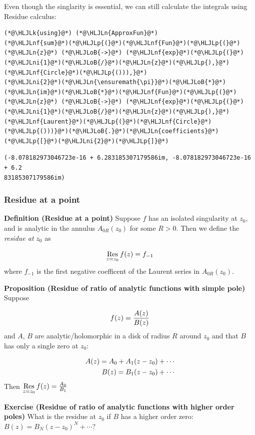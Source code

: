 \documentclass[12pt,a4paper]{article}
\newcommand{\HLJLk}[1]{\textcolor[RGB]{148,91,176}{\textbf{#1}}}
\newcommand{\HLJLn}[1]{#1}
\newcommand{\HLJLnf}[1]{\textcolor[RGB]{66,102,213}{#1}}
\newcommand{\HLJLni}[1]{\textcolor[RGB]{59,151,46}{#1}}
\newcommand{\HLJLoB}[1]{\textcolor[RGB]{102,102,102}{\textbf{#1}}}
\newcommand{\HLJLp}[1]{#1}
\begin{document}
Even though the singlarity is essential, we can still calculate the integrals using Residue calculus:


\begin{lstlisting}
(*@\HLJLk{using}@*) (*@\HLJLn{ApproxFun}@*)
(*@\HLJLnf{sum}@*)(*@\HLJLp{(}@*)(*@\HLJLnf{Fun}@*)(*@\HLJLp{(}@*)(*@\HLJLn{z}@*) (*@\HLJLoB{->}@*) (*@\HLJLnf{exp}@*)(*@\HLJLp{(}@*)(*@\HLJLni{1}@*)(*@\HLJLoB{/}@*)(*@\HLJLn{z}@*)(*@\HLJLp{),}@*) (*@\HLJLnf{Circle}@*)(*@\HLJLp{())),}@*) 
(*@\HLJLni{2}@*)(*@\HLJLn{\ensuremath{\pi}}@*)(*@\HLJLoB{*}@*)(*@\HLJLn{im}@*)(*@\HLJLoB{*}@*)(*@\HLJLnf{Fun}@*)(*@\HLJLp{(}@*)(*@\HLJLn{z}@*) (*@\HLJLoB{->}@*) (*@\HLJLnf{exp}@*)(*@\HLJLp{(}@*)(*@\HLJLni{1}@*)(*@\HLJLoB{/}@*)(*@\HLJLn{z}@*)(*@\HLJLp{),}@*) (*@\HLJLnf{Laurent}@*)(*@\HLJLp{(}@*)(*@\HLJLnf{Circle}@*)(*@\HLJLp{()))}@*)(*@\HLJLoB{.}@*)(*@\HLJLn{coefficients}@*)(*@\HLJLp{[}@*)(*@\HLJLni{2}@*)(*@\HLJLp{]}@*)
\end{lstlisting}

\begin{lstlisting}
(-8.078182973046723e-16 + 6.283185307179586im, -8.078182973046723e-16 + 6.2
83185307179586im)
\end{lstlisting}


\subsubsection{Residue at a point}
\textbf{Definition (Residue at a point)} Suppose $f$ has an isolated singularity at $z_0$, and is analytic in the annulus $A_{0R}(z_0)$ for some $R > 0$. Then we define the \emph{residue at} $z_0$ as

\[
{\underset{z = z_0}{\rm Res}}\, f(z) = f_{-1}
\]
where $f_{-1}$ is the first negative coefficent of the Laurent series in $A_{0R}(z_0)$. 

\textbf{Proposition (Residue of ratio of analytic functions with simple pole)} Suppose

\[
f(z) = {A(z) \over B(z)}
\]
and $A$, $B$ are analytic/holomorphic in a disk of radius $R$ around $z_0$ and that $B$ has only a single zero at $z_0$:


\begin{align*}
A(z) = A_0 + A_1(z-z_0) + \cdots \cr
B(z) = B_1(z-z_0) + \cdots
\end{align*}
Then ${\underset{z = z_0}{\rm Res}}\, f(z) = {A_0 \over B_1}$

\textbf{Exercise (Residue of ratio of analytic functions with higher order  poles)} What is the residue at $z_0$ if $B$ has a higher order zero: $B(z) = B_N (z-z_0)^N + \cdots$?
\end{document}
